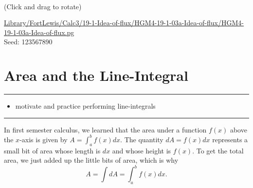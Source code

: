 \documentclass[10pt,]{book}
\theoremstyle{plain}
\theoremstyle{definition}
\theoremstyle{definition}
\theoremstyle{definition}
\theoremstyle{definition}
\newenvironment{objectives}[1]{\noindent\rule{\linewidth}{0.1ex}\newline{\textbf{{\large#1}}\par\smallskip}}{\par\noindent\rule{\linewidth}{0.1ex}\par\smallskip}
\theoremstyle{definition}
\numberwithin{equation}{section}
\begin{document}
\begin{exerciselist}
\begin{mdframed}
{\begin{center}
\leavevmode\\\relax 
(Click and drag to rotate)
\end{center}


}\par\vspace*{2ex}%
{\tiny\ttfamily\noindent\url{Library/FortLewis/Calc3/19-1-Idea-of-flux/HGM4-19-1-03a-Idea-of-flux/HGM4-19-1-03a-Idea-of-flux.pg}\\Seed: 123567890\hfill}\end{mdframed}
\end{exerciselist}
\typeout{************************************************}
\typeout{************************************************}
\section[{Area and the Line-Integral}]{Area and the Line-Integral}\label{ch09_02_lineintegrals}
\begin{objectives}{Objectives}\label{objectives-24}
%
\begin{itemize}[label=\textbullet]
\item{}motivate and practice performing line-integrals%
\end{itemize}
\end{objectives}
In first semester calculus, we learned that the area under a function \(f(x)\) above the \(x\)-axis is given by \(A = \int_a^b f(x) dx\). The quantity \(dA= f(x) dx\) represents a small bit of area whose length is \(dx\) and whose height is \(f(x)\). To get the total area, we just added up the little bits of area, which is why%
\begin{equation*}
A=\int dA = \int_a^b f(x) dx.
\end{equation*}
%
\end{document}
